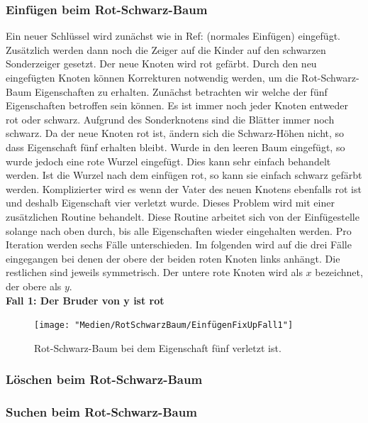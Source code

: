 \documentclass[a4paper,12pt]{article}
\begin{document}
\subsubsection{Einfügen beim Rot-Schwarz-Baum}
Ein neuer Schlüssel wird zunächst wie in Ref: (normales Einfügen) eingefügt. Zusätzlich werden dann noch die Zeiger auf die Kinder auf den schwarzen Sonderzeiger gesetzt. Der neue Knoten wird rot gefärbt. Durch den neu eingefügten Knoten können Korrekturen notwendig werden, um die Rot-Schwarz-Baum Eigenschaften zu erhalten. Zunächst betrachten wir welche der fünf Eigenschaften betroffen sein können. Es ist immer noch jeder Knoten entweder rot oder schwarz. Aufgrund des Sonderknotens sind die Blätter immer noch schwarz. Da der neue Knoten rot ist, ändern sich die Schwarz-Höhen nicht, so dass Eigenschaft fünf erhalten bleibt. Wurde in den leeren Baum eingefügt, so wurde jedoch eine rote Wurzel eingefügt. Dies kann sehr einfach behandelt werden. Ist die Wurzel nach dem einfügen rot, so kann sie einfach schwarz gefärbt werden. Komplizierter wird es wenn der Vater des neuen Knotens ebenfalls rot ist und deshalb Eigenschaft vier verletzt wurde. Dieses Problem wird mit einer zusätzlichen Routine behandelt. Diese Routine arbeitet sich von der Einfügestelle solange nach oben durch, bis alle Eigenschaften wieder eingehalten werden. Pro Iteration werden sechs Fälle unterschieden. Im folgenden wird auf die drei Fälle eingegangen bei denen der obere der beiden roten Knoten links anhängt. Die restlichen sind jeweils symmetrisch. Der untere rote Knoten wird als $x$ bezeichnet, der obere als $y$.  \\
\textbf{Fall 1: Der Bruder von y ist rot }
\begin{figure}[h]
	\centering
	\texttt{[image: "Medien/RotSchwarzBaum/EinfügenFixUpFall1"]}
	\caption{Rot-Schwarz-Baum bei dem Eigenschaft fünf verletzt ist.  }
	\label{fig:EinfügenFixUpFall1}
\end{figure}



   
\subsubsection{Löschen beim Rot-Schwarz-Baum}

\subsubsection{Suchen beim Rot-Schwarz-Baum}
\end{document}
